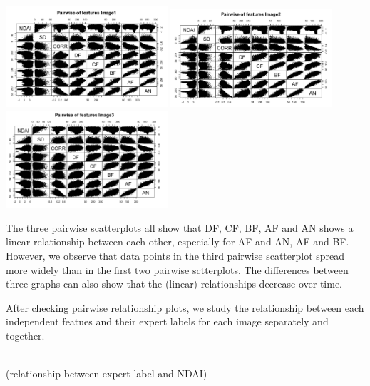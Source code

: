 \documentclass[11pt]{article}
\begin{document}
\includegraphics[width = 6cm]{1(c)image1.png}
\includegraphics[width = 6cm]{1(c)image2.png}
\includegraphics[width = 6cm]{1(c)image3.png}

The three pairwise scatterplots all show that DF, CF, BF, AF and AN shows a linear relationship between each other, especially for AF and AN, AF and BF. However, we observe that data points in the third pairwise scatterplot spread more widely than in the first two pairwise sctterplots. The differences between three graphs can also show that the (linear) relationships decrease over time.

After checking pairwise relationship plots, we study the relationship between each independent featues and their expert labels for each image separately and together.

\mbox{}\\
(relationship between expert label and NDAI)
\end{document}
